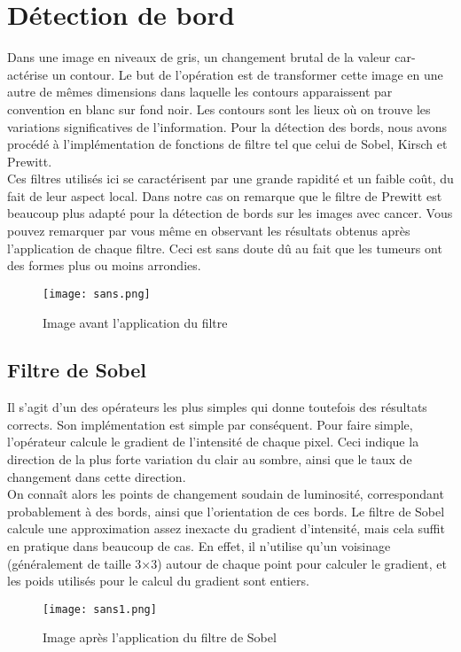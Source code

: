 \documentclass[a4paper,11pt]{report}
\begin{document}
\section{Détection de bord}
Dans une image en niveaux de gris, un changement brutal de la valeur car-
actérise un contour. Le but de l'opération est de transformer cette image en
une autre de mêmes dimensions dans laquelle les contours apparaissent par
convention en blanc sur fond noir. Les contours sont les lieux où on trouve
les variations significatives de l'information. Pour la détection des bords,
nous avons procédé à l'implémentation de fonctions de filtre tel que celui
de Sobel, Kirsch et Prewitt.\\
Ces filtres utilisés ici se caractérisent par une
grande rapidité et un faible coût, du fait de leur aspect local. Dans notre
cas on remarque que le filtre de Prewitt est beaucoup plus adapté pour la
détection de bords sur les images avec cancer. Vous pouvez remarquer par
vous même en observant les résultats obtenus après l'application de chaque
filtre. Ceci est sans doute dû au fait que les tumeurs ont des formes plus ou
moins arrondies.
\begin{figure}[!htbp]
\begin{center}
\texttt{[image: sans.png]}
\caption{Image avant l'application du filtre}
\end{center}
\end{figure} 

\subsection{Filtre de Sobel}
Il s'agit d'un des opérateurs les plus simples qui
donne toutefois des résultats corrects. Son implémentation est simple par
conséquent. Pour faire simple, l'opérateur calcule le gradient de l'intensité
de chaque pixel. Ceci indique la direction de la plus forte variation du
clair au sombre, ainsi que le taux de changement dans cette direction.\\
On
connaît alors les points de changement soudain de luminosité, correspondant
probablement à des bords, ainsi que l'orientation de ces bords. Le filtre de
Sobel calcule une approximation assez inexacte du gradient d'intensité, mais
cela suffit en pratique dans beaucoup de cas. En effet, il n'utilise qu'un
voisinage (généralement de taille 3×3) autour de chaque point pour calculer
le gradient, et les poids utilisés pour le calcul du gradient sont entiers.

\begin{figure}[!htbp]
\begin{center}
\texttt{[image: sans1.png]}
\caption{Image après l'application du filtre de Sobel}
\end{center}
\end{figure} 
\end{document}
